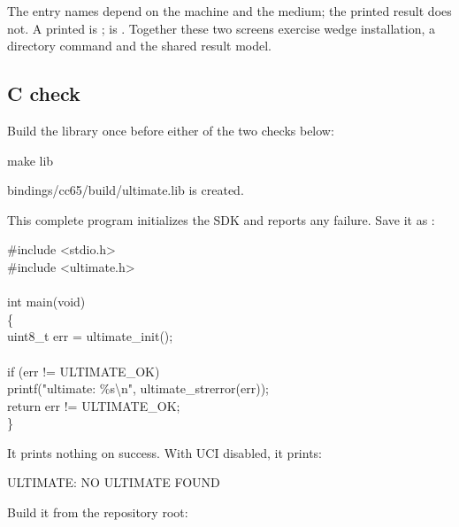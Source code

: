 The entry names depend on the machine and the medium; the printed result does
not. A printed  is ;  is
. Together these two screens exercise wedge
installation, a directory command and the shared result model.


\subsection*{C check}

Build the library once before either of the two checks below:

\begin{listingbox}
make lib
\end{listingbox}

\begin{resultbox}
bindings/cc65/build/ultimate.lib is created.
\end{resultbox}

This complete program initializes the SDK and reports any failure. Save it as
:

\begin{listingbox}
\#include <stdio.h>\\
\#include <ultimate.h>\\
\\
int main(void)\\
\{\\
\hspace*{1em}uint8\_t err = ultimate\_init();\\
\\
\hspace*{1em}if (err != ULTIMATE\_OK)\\
\hspace*{2em}printf("ultimate: \%s\textbackslash n", ultimate\_strerror(err));\\
\hspace*{1em}return err != ULTIMATE\_OK;\\
\}
\end{listingbox}

It prints nothing on success. With UCI disabled, it prints:

\begin{outputbox}
ULTIMATE: NO ULTIMATE FOUND
\end{outputbox}

Build it from the repository root:

